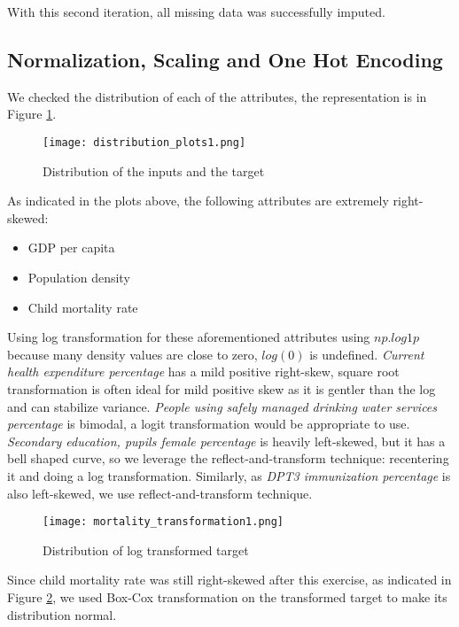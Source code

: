 \documentclass[10pt,a4paper]{article}
\begin{document}
    With this second iteration, all missing data was successfully imputed.

    \subsection{Normalization, Scaling and One Hot Encoding}

    We checked the distribution of each of the attributes, the representation is in Figure \ref{fig:distribution}.
    \begin{figure}[H]
    	\centering
    	\texttt{[image: distribution\_plots1.png]}
    	\caption{Distribution of the inputs and the target}
    	\label{fig:distribution}
    \end{figure}

As indicated in the plots above, the following attributes are extremely right-skewed:
    \begin{itemize}
        \item GDP per capita
        \item Population density
        \item Child mortality rate
    \end{itemize}

Using log transformation for these aforementioned attributes using $np.log1p$ because many density values are close to zero, $log(0)$ is undefined. \textit{Current health expenditure percentage} has a mild positive right-skew, square root transformation is often ideal for mild positive skew as it is gentler than the log and can stabilize variance. \textit{People using safely managed drinking water services percentage} is bimodal, a logit transformation would be appropriate to use. \textit{Secondary education, pupils female percentage} is heavily left-skewed, but it has a bell shaped curve, so we leverage the reflect-and-transform technique: recentering it and doing a log transformation. Similarly, as \textit{DPT3 immunization percentage} is also left-skewed, we use reflect-and-transform technique.

    \begin{figure}[H]
    	\centering
    	\texttt{[image: mortality\_transformation1.png]}
    	\caption{Distribution of log transformed target}
    	\label{fig:distribution_after_transformed_mortality}
    \end{figure}

Since child mortality rate was still right-skewed after this exercise, as indicated in Figure \ref{fig:distribution_after_transformed_mortality}, we used Box-Cox transformation on the transformed target to make its distribution normal.
\end{document}

